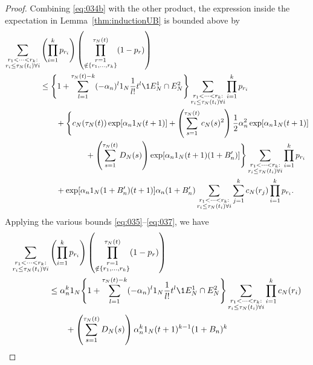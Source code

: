 \begin{proof}
Combining \eqref{eq:034b} with the other product, the expression inside the expectation in Lemma~\ref{thm:inductionUB} is bounded above by
\begin{align*}
\sum_{\substack{r_1 <\dots< r_k :\\ r_i \leq \tau_N(t_i) \forall i}}
        &\left( \prod_{i=1}^k p_{r_i} \right)
        \left( \prod_{\substack{r=1 \\ \notin \{r_1,\dots,r_k\} }}^{\tau_N(t)} 
        (1-p_r) \right) \\
&\leq \Bigg\{ 1+ \sum_{l=1}^{\tau_N(t) -k} (-\alpha_n)^l \ON 
        \frac{1}{l!} t^l \1{E_N^1 \cap E_N^2} \Bigg\}
        \sum_{\substack{r_1 <\dots< r_k :\\ r_i \leq \tau_N(t_i) \forall i}}
        \prod_{i=1}^k p_{r_i} \\
    &\qquad+ \Bigg\{ c_N(\tau_N(t)) 
        \exp[ \alpha_n \ON (t+1) ]
        + \left( \sum_{s=1}^{\tau_N(t)} c_N(s)^2 \right)
        \frac{1}{2} \alpha_n^2 \exp[ \alpha_n \ON (t+1) ] \\
    &\hspace{2cm}+ \left( \sum_{s=1}^{\tau_N(t)} D_N(s) \right)
        \exp[ \alpha_n \ON (t+1) (1+B_n^\prime) ] \Bigg\}
        \sum_{\substack{r_1 <\dots< r_k :\\ r_i \leq \tau_N(t_i) \forall i}}
        \prod_{i=1}^k p_{r_i} \\
    &\qquad+ \exp[ \alpha_n \ON (1 + B_n^\prime) (t+1) ]
        \alpha_n (1 + B_n^\prime)
        \sum_{\substack{r_1 <\dots< r_k :\\ r_i \leq \tau_N(t_i) \forall i}}
        \sum_{j=1}^k c_N(r_j)
        \prod_{i=1}^k p_{r_i} .
\end{align*}
Applying the various bounds \eqref{eq:035}--\eqref{eq:037}, we have
\begin{align*}
\sum_{\substack{r_1 <\dots< r_k :\\ r_i \leq \tau_N(t_i) \forall i}}
        &\left( \prod_{i=1}^k p_{r_i} \right)
        \left( \prod_{\substack{r=1 \\ \notin \{r_1,\dots,r_k\} }}^{\tau_N(t)} 
        (1-p_r) \right) \\
&\leq \alpha_n^k \ON \Bigg\{
        1+ \sum_{l=1}^{\tau_N(t) -k} (-\alpha_n)^l \ON \frac{1}{l!} t^l
        \1{E_N^1 \cap E_N^2} \Bigg\}
        \sum_{\substack{r_1 <\dots< r_k :\\ r_i \leq \tau_N(t_i) \forall i}}
        \prod_{i=1}^k c_N(r_i) \\
    &\qquad+ \left( \sum_{s=1}^{\tau_N(t)} D_N(s) \right)
        \alpha_n^k \ON (t+1)^{k-1} (1+B_n)^k

\end{align*}
\end{proof}
